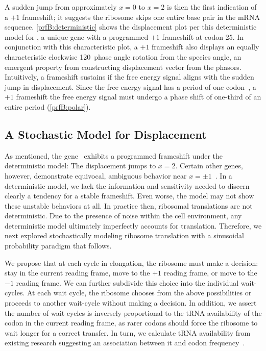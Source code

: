 \documentclass[12pt, draft]{article}
\numberwithin{equation}{section}
\begin{document}
A sudden jump from approximately $x = 0$ to $x = 2$ is then the first
indication of a $+1$ frameshift; it suggests the ribosome skips one
entire base pair in the mRNA sequence.  \autoref{prfB:deterministic}
shows the displacement plot per this deterministic model for \prfB, a
unique gene with a programmed $+1$ frameshift at codon 25. In
conjunction with this characteristic plot, a $+1$ frameshift also
displays an equally characteristic clockwise 120\degree\ phase angle
rotation from the species angle, an emergent property from
constructing displacement vector from the phasors.  Intuitively, a
frameshift sustains if the free energy signal aligns with the sudden
jump in displacement.  Since the free energy signal has a period of
one codon~\cite{lalit:mechanics}, a $+1$ frameshift the free energy
signal must undergo a phase shift of one-third of an entire period
(\autoref{prfB:polar}).

\subsection{A Stochastic Model for Displacement}
\label{stochastic}

As mentioned, the gene \prfB\ exhibits a programmed frameshift under
the deterministic model: The displacement jumps to $x=2$.  Certain
other genes, however, demonstrate equivocal, ambiguous behavior near
$x = \pm 1$~\cite{lalit:embs}.  In a deterministic model, we lack the
information and sensitivity needed to discern clearly a tendency for a
stable frameshift. Even worse, the model may not show these unstable
behaviors at all. In practice then, ribosomal translations are not
deterministic. Due to the presence of noise within the cell
environment, any deterministic model ultimately imperfectly accounts
for translation. Therefore, we next explored stochastically modeling
ribosome translation with a sinusoidal probability paradigm that
follows.

We propose that at each cycle in elongation, the ribosome must make a
decision: stay in the current reading frame, move to the $+1$ reading
frame, or move to the $-1$ reading frame.  We can further subdivide
this choice into the individual wait-cycles.  At each wait cycle, the
ribosome chooses from the above possibilities or proceeds to another
wait-cycle without making a decision.  In addition, we assert the 
number of wait cycles is inversely proportional to the tRNA availability of 
the codon in the current reading frame, as rarer codons should force the 
ribosome to wait longer for a correct transfer. In turn, we calculate
tRNA availability from existing research suggesting an association
between it and codon frequency~\cite{ikemura}.
\end{document}
